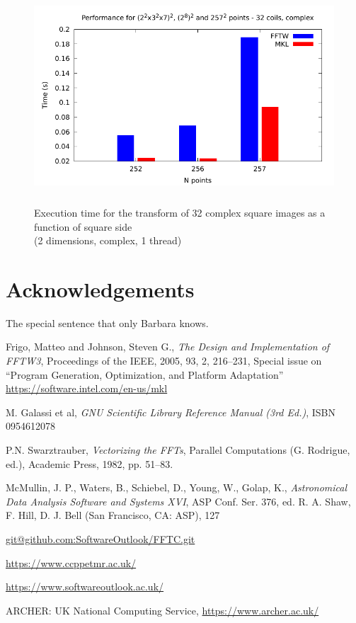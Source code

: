 \documentclass[12pt, a4paper]{article}
\begin{document}
\begin{figure}[H]
\captionsetup{width=0.6\textwidth}
\centering
\includegraphics[height=8cm]{graphs/ccppetmr.pdf}
\caption{Execution time for the transform of 32 complex square images as a function of square side\\(2 dimensions, complex, 1 thread)}
\label{method}
\end{figure}

\section{Acknowledgements}
The special sentence that only Barbara knows.
\begin{thebibliography}{9}

Frigo, Matteo and Johnson, Steven G.,
{\it The Design and Implementation of FFTW3},
Proceedings of the IEEE,
2005,
93,
2,
216--231,
Special issue on ``Program Generation, Optimization, and Platform Adaptation''
\hyperlink{https://software.intel.com/en-us/mkl}{https://software.intel.com/en-us/mkl}

M. Galassi et al, {\it GNU Scientific Library Reference Manual (3rd Ed.)}, ISBN 0954612078
  
P.N. Swarztrauber, {\it Vectorizing the FFTs}, Parallel Computations (G. Rodrigue, ed.), Academic Press, 1982, pp. 51--83.
  
McMullin, J. P., Waters, B., Schiebel, D., Young, W., Golap, K.,
{\it Astronomical Data Analysis Software and Systems XVI},
ASP Conf. Ser. 376, ed. R. A. Shaw, F. Hill, D. J. Bell (San Francisco, CA: ASP), 127

\hyperlink{git@github.com:SoftwareOutlook/FFTC.git}{git@github.com:SoftwareOutlook/FFTC.git}
    
\hyperlink{https://www.ccppetmr.ac.uk/}{https://www.ccppetmr.ac.uk/}

\hyperlink{https://www.softwareoutlook.ac.uk/}{https://www.softwareoutlook.ac.uk/}

ARCHER: UK National Computing Service, \hyperlink{https://www.archer.ac.uk/}{https://www.archer.ac.uk/}
  
\end{thebibliography}
\end{document}
